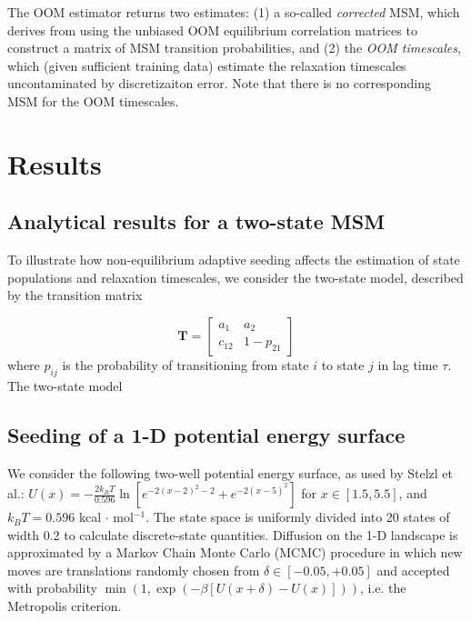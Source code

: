 \documentclass[%
 aip,
rsi,%
 amsmath,amssymb,
 reprint,%
]{revtex4-1}
\begin{document}
The OOM estimator returns two estimates: (1) a so-called \textit{corrected} MSM, which derives from using the unbiased OOM equilibrium correlation matrices to construct a matrix of MSM transition probabilities, and (2) the \textit{OOM timescales}, which (given sufficient training data) estimate the relaxation timescales uncontaminated by discretizaiton error.  Note that there is no corresponding MSM for the OOM timescales. 





\section*{Results}

\subsection*{Analytical results for a two-state MSM}

To illustrate how non-equilibrium adaptive seeding affects the estimation of state populations and relaxation timescales, we consider the two-state model, described by the transition matrix

\begin{equation}
\mathbf{T} = \begin{bmatrix} 
a_1 & a_2 \\ 
c_{12} & 1-p_{21} 
\end{bmatrix}
\end{equation}
where $p_{ij}$ is the probability of transitioning from state $i$ to state $j$ in lag time $\tau$.  The two-state model





\subsection*{Seeding of a 1-D potential energy surface}

We consider the following two-well potential energy surface, as used by Stelzl et al.\cite{Stelzl:2017gra}:  $U(x) = -\frac{2k_BT}{0.596} \ln [ e^{-2(x-2)^2-2} + e^{-2(x-5)^2} ] $
for $x \in [1.5,5.5]$, and $k_BT = 0.596$ kcal $\cdot$ mol$^{-1}$.  The state space is uniformly divided into 20 states of width 0.2 to calculate discrete-state quantities. Diffusion on the 1-D landscape is approximated by a Markov Chain Monte Carlo (MCMC) procedure in which new moves are translations randomly chosen from $\delta \in [-0.05, +0.05]$ and accepted with probability $\min(1, \exp( -\beta [U(x+\delta)-U(x)]))$, i.e. the Metropolis criterion.
\end{document}
